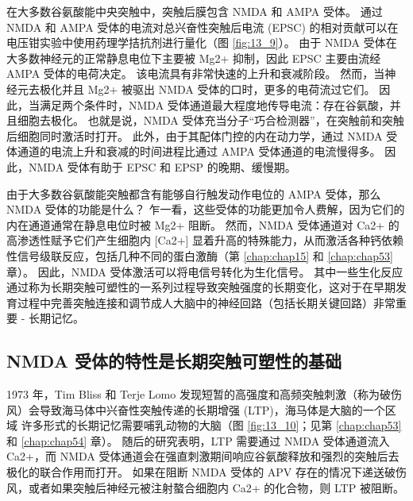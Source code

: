 在大多数谷氨酸能中央突触中，突触后膜包含 NMDA 和 AMPA 受体。 
通过 NMDA 和 AMPA 受体的电流对总兴奋性突触后电流 (EPSC) 的相对贡献可以在电压钳实验中使用药理学拮抗剂进行量化（图 \ref{fig:13_9}）。
由于 NMDA 受体在大多数神经元的正常静息电位下主要被 Mg2+ 抑制，因此 EPSC 主要由流经 AMPA 受体的电荷决定。 
该电流具有非常快速的上升和衰减阶段。 
然而，当神经元去极化并且 Mg2+ 被驱出 NMDA 受体的口时，更多的电荷流过它们。 
因此，当满足两个条件时，NMDA 受体通道最大程度地传导电流：存在谷氨酸，并且细胞去极化。 
也就是说，NMDA 受体充当分子“巧合检测器”，在突触前和突触后细胞同时激活时打开。
此外，由于其配体门控的内在动力学，通过 NMDA 受体通道的电流上升和衰减的时间进程比通过 AMPA 受体通道的电流慢得多。 
因此，NMDA 受体有助于 EPSC 和 EPSP 的晚期、缓慢期。


由于大多数谷氨酸能突触都含有能够自行触发动作电位的 AMPA 受体，那么 NMDA 受体的功能是什么？ 
乍一看，这些受体的功能更加令人费解，因为它们的内在通道通常在静息电位时被 Mg2+ 阻断。 然而，NMDA 受体通道对 Ca2+ 的高渗透性赋予它们产生细胞内 [Ca2+] 显着升高的特殊能力，从而激活各种钙依赖性信号级联反应，包括几种不同的蛋白激酶（第 \ref{chap:chap15} 和 \ref{chap:chap53} 章）。 
因此，NMDA 受体激活可以将电信号转化为生化信号。 其中一些生化反应通过称为长期突触可塑性的一系列过程导致突触强度的长期变化，这对于在早期发育过程中完善突触连接和调节成人大脑中的神经回路（包括长期关键回路）非常重要 - 长期记忆。



\subsection{NMDA 受体的特性是长期突触可塑性的基础}

1973 年，Tim Bliss 和 Terje Lomo 发现短暂的高强度和高频突触刺激（称为破伤风）会导致海马体中兴奋性突触传递的长期增强 (LTP)，海马体是大脑的一个区域 许多形式的长期记忆需要哺乳动物的大脑（图 \ref{fig:13_10}；见第 \ref{chap:chap53} 和 \ref{chap:chap54} 章）。 
随后的研究表明，LTP 需要通过 NMDA 受体通道流入 Ca2+，而 NMDA 受体通道会在强直刺激期间响应谷氨酸释放和强烈的突触后去极化的联合作用而打开。 
如果在阻断 NMDA 受体的 APV 存在的情况下递送破伤风，或者如果突触后神经元被注射螯合细胞内 Ca2+ 的化合物，则 LTP 被阻断。

